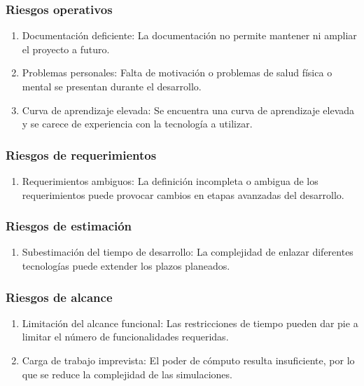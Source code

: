 \subsubsection{Riesgos operativos}
\begin{enumerate}[label*=RO\arabic*]
	\item Documentación deficiente: La documentación no permite mantener ni ampliar el proyecto a futuro.
	
	\item Problemas personales: Falta de motivación o problemas de salud física o mental se presentan durante el desarrollo.
	
	\item Curva de aprendizaje elevada: Se encuentra una curva de aprendizaje elevada y se carece de experiencia con la tecnología a utilizar.
\end{enumerate}
\subsubsection{Riesgos de requerimientos}
\begin{enumerate}[label*=RR\arabic*]
	\item Requerimientos ambiguos: La definición incompleta o ambigua de los requerimientos puede provocar cambios en etapas avanzadas del desarrollo.
\end{enumerate}

\subsubsection{Riesgos de estimación}
\begin{enumerate}[label*=RE\arabic*]
	\item Subestimación del tiempo de desarrollo: La complejidad de enlazar diferentes tecnologías puede extender los plazos planeados.
\end{enumerate}

\subsubsection{Riesgos de alcance}
\begin{enumerate}[label*=RA\arabic*]
	\item Limitación del alcance funcional: Las restricciones de tiempo pueden dar pie a limitar el número de funcionalidades requeridas.

	\item Carga de trabajo imprevista: El poder de cómputo resulta insuficiente, por lo que se reduce la complejidad de las simulaciones.
\end{enumerate}

